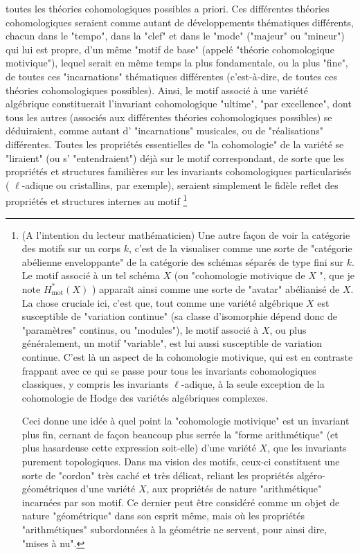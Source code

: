 toutes les théories cohomologiques possibles a priori. Ces différentes théories cohomologiques seraient comme autant de développements thématiques différents, chacun dans le "tempo", dans la "clef" et dans le "mode" ("majeur" ou "mineur") qui lui est propre, d'un même "motif de base" (appelé "théorie cohomologique motivique"), lequel serait en même temps la plus fondamentale, ou la plus "fine", de toutes ces "incarnations" thématiques différentes (c'est-à-dire, de toutes ces théories cohomologiques possibles). Ainsi, le motif associé à une variété algébrique constituerait l'invariant cohomologique "ultime", "par excellence", dont tous les autres (associés aux différentes théories cohomologiques possibles) se déduiraient, comme autant d' "incarnations" musicales, ou de "réalisations" différentes. Toutes les propriétés essentielles de "la cohomologie" de la variété se "liraient" (ou s' "entendraient") déjà sur le motif correspondant, de sorte que les propriétés et structures familières sur les invariants cohomologiques particularisés ( $\ell$-adique ou cristallins, par exemple), seraient simplement le fidèle reflet des propriétés et structures internes au motif \footnote{(A l'intention du lecteur mathématicien) Une autre façon de voir la catégorie des motifs sur un corps $k$, c'est de la visualiser comme une sorte de "catégorie abélienne enveloppante" de la catégorie des schémas séparés de type fini sur $k$. Le motif associé à un tel schéma $X$ (ou "cohomologie motivique de $X$ ", que je note $H_{\text {mot}}^{*}(X)$ ) apparaît ainsi comme une sorte de "avatar" abélianisé de $X$. La chose cruciale ici, c'est que, tout comme une variété algébrique $X$ est susceptible de "variation continue" (sa classe d'isomorphie dépend donc de "paramètres" continus, ou "modules"), le motif associé à $X$, ou plus généralement, un motif "variable", est lui aussi susceptible de variation continue. C'est là un aspect de la cohomologie motivique, qui est en contraste frappant avec ce qui se passe pour tous les invariants cohomologiques classiques, y compris les invariants $\ell$-adique, à la seule exception de la cohomologie de Hodge des variétés algébriques complexes.

Ceci donne une idée à quel point la "cohomologie motivique" est un invariant plus fin, cernant de façon beaucoup plus serrée la "forme arithmétique" (et plus hasardeuse cette expression soit-elle) d'une variété $X$, que les invariants purement topologiques. Dans ma vision des motifs, ceux-ci constituent une sorte de "cordon" très caché et très délicat, reliant les propriétés algéro-géométriques d'une variété $X$, aux propriétés de nature "arithmétique" incarnées par son motif. Ce dernier peut être considéré comme un objet de nature "géométrique" dans son esprit même, mais où les propriétés "arithmétiques" subordonnées à la géométrie ne servent, pour ainsi dire, "mises à nu".

}
